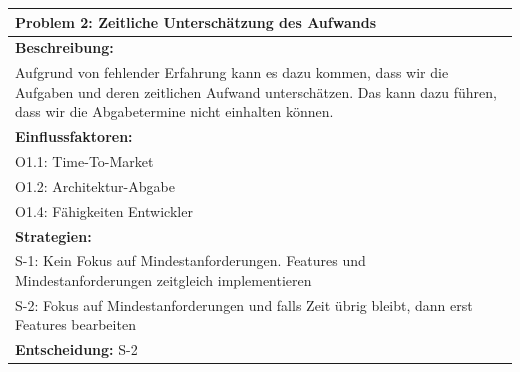 \documentclass[fontsize=12pt,paper=a4,twoside]{scrartcl}
\begin{document}
\begin{longtable}{|p{15cm}|}
\hline
Problem 2: Zeitliche Unterschätzung des Aufwands                                                                           
\\ \hline                                                                                                                                                                                                                                                                                                                                                                                                                                                                                                                                                        
\textbf{Beschreibung:} \\
Aufgrund von fehlender Erfahrung kann es dazu kommen, dass wir die Aufgaben und deren zeitlichen Aufwand unterschätzen.
Das kann dazu führen, dass wir die Abgabetermine nicht einhalten können.
\\ \hline
\textbf{Einflussfaktoren:} \\
O1.1: Time-To-Market \\
O1.2: Architektur-Abgabe \\
O1.4: Fähigkeiten Entwickler
\\ \hline
\textbf{Strategien:} \\
S-1: Kein Fokus auf Mindestanforderungen. Features und Mindestanforderungen zeitgleich implementieren  \\
S-2: Fokus auf Mindestanforderungen und falls Zeit übrig bleibt, dann erst Features bearbeiten
 \\ \hline
 \textbf{Entscheidung:} S-2
\\ \hline
\end{longtable}
\newpage
\end{document}
